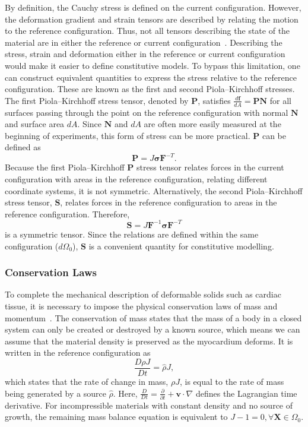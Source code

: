 \documentclass[a4paper,11pt]{article}
\begin{document}
By deﬁnition, the Cauchy stress is deﬁned on the current conﬁguration. However, the deformation gradient and strain tensors are described by relating the motion to the reference configuration. Thus, not all tensors describing the state of the material are in either the reference or current configuration~\cite{bonet1997nonlinear}. Describing the stress, strain and deformation either in the reference or current configuration would make it easier to define constitutive models. To bypass this limitation, one can construct equivalent quantities to express the stress relative to the reference configuration. These are known as the ﬁrst and second Piola–Kirchhoff stresses. 
The first Piola–Kirchhoff stress tensor, denoted by $\mathbf{P}$, satisfies $\frac{d\mathbf{f}}{dA}=\mathbf{PN}$ for all surfaces passing through the point on the reference conﬁguration with normal $\mathbf{N}$ and surface area $dA$. Since $\mathbf{N}$ and $dA$ are often more easily measured at the beginning of experiments, this form of stress can be more practical. $\mathbf{P}$ can be defined as
\begin{equation}
\mathbf{P}=J\boldsymbol{\sigma}\mathbf{F}^{-T}.
\end{equation}
Because the first Piola–Kirchhoff $\mathbf{P}$ stress tensor relates forces in the current configuration with areas in the reference configuration, relating different coordinate systems, it is not symmetric. Alternatively, the second Piola–Kirchhoff stress tensor, $\mathbf{S}$, relates forces in the reference configuration to areas in the reference configuration. Therefore,
\begin{equation}
\mathbf{S}=J\mathbf{F}^{-1}\boldsymbol{\sigma}\mathbf{F}^{-T}
\end{equation}
is a symmetric tensor. Since the relations are defined within the same configuration ($d\Omega_0$), $\mathbf{S}$ is a convenient quantity for constitutive modelling.

\subsubsection{Conservation Laws}

To complete the mechanical description of deformable solids such as cardiac tissue, it is necessary to impose the physical conservation laws of mass and momentum~\cite{quarteroni2019,holzapfel2002nonlinear,chapelle2010poroelastic}. The conservation of mass states that the mass of a body in a closed system can only be created or destroyed by a known source, which means we can assume that the material density is preserved as the myocardium deforms. It is written in the reference configuration as
\begin{equation}
\frac{D\rho J}{Dt}=\hat{\rho}J,
\end{equation}
which states that the rate of change in mass, $\rho J$, is equal to the rate of mass being generated by a source $\hat{\rho}$. Here, $\frac{D}{Dt} = \frac{\partial}{\partial t} + \mathbf{v} \cdot \nabla$ deﬁnes the Lagrangian time derivative. For incompressible materials with constant density and no source of growth, the remaining mass balance equation is equivalent to $J - 1 = 0, \forall \mathbf{X} \in \Omega_0$.
\end{document}
